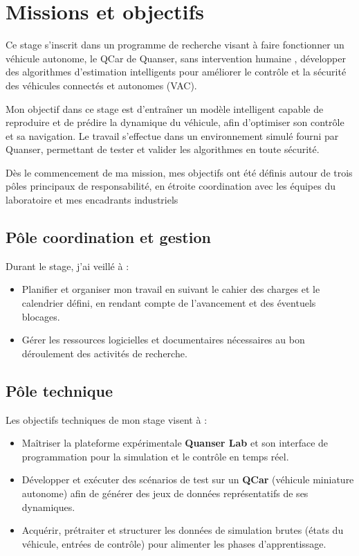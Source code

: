 \documentclass[12pt, a4paper]{report}
\begin{document}
\section{Missions et objectifs}

{Ce stage s'inscrit dans un programme de recherche visant à faire fonctionner un véhicule autonome, le QCar de Quanser, sans intervention humaine ,
développer des algorithmes d’estimation intelligents pour améliorer le contrôle et la sécurité des véhicules connectés et autonomes (VAC).
}

Mon objectif dans ce stage est d'entraîner un modèle intelligent capable de reproduire et de prédire la dynamique du véhicule, afin d'optimiser son contrôle et sa navigation. Le travail s'effectue dans un environnement simulé fourni par Quanser, permettant de tester et valider les algorithmes en toute sécurité.


Dès le commencement de ma mission, mes objectifs ont été définis autour de trois pôles principaux de responsabilité, en étroite coordination avec les équipes du laboratoire et mes encadrants industriels

\subsection{Pôle coordination et gestion}
Durant le stage, j'ai veillé à :
\begin{itemize}
    \item Planifier et organiser mon travail en suivant le cahier des charges et le calendrier défini, en rendant compte de l'avancement et des éventuels blocages.
    \item Gérer les ressources logicielles et documentaires nécessaires au bon déroulement des activités de recherche.
\end{itemize}

\subsection{Pôle technique}
Les objectifs techniques de mon stage visent à :
\begin{itemize}
    \item Maîtriser la plateforme expérimentale \textbf{Quanser Lab} et son interface de programmation pour la simulation et le contrôle en temps réel.
    \item Développer et exécuter des scénarios de test sur un \textbf{QCar} (véhicule miniature autonome) afin de générer des jeux de données représentatifs de ses dynamiques.
    \item Acquérir, prétraiter et structurer les données de simulation brutes (états du véhicule, entrées de contrôle) pour alimenter les phases d'apprentissage.
\end{itemize}
\end{document}
